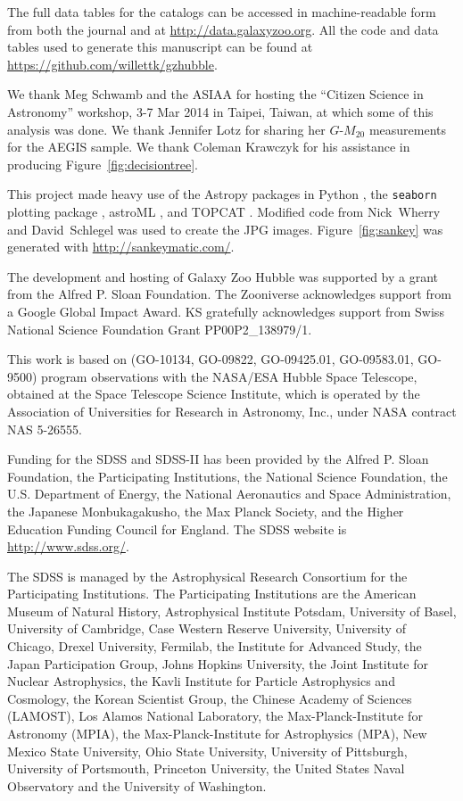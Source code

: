 \documentclass[twocolumn]{aastex6}
\begin{document}
The full data tables for the catalogs can be accessed in machine-readable form
from both the journal and at \url{http://data.galaxyzoo.org}. All the code and
data tables used to generate this manuscript can be found at
\url{https://github.com/willettk/gzhubble}.
 
\acknowledgments

We thank Meg Schwamb and the ASIAA for hosting the ``Citizen Science in
Astronomy'' workshop, 3-7 Mar 2014 in Taipei, Taiwan, at which some of this
analysis was done. We thank Jennifer Lotz for sharing her $G$-$M_{20}$
measurements for the AEGIS sample. We thank Coleman Krawczyk for his assistance
in producing Figure~\ref{fig:decisiontree}.

This project made heavy use of the Astropy packages in Python \citep{ast13},
the \texttt{seaborn} plotting package \citep{was15}, astroML \citep{van12}, and
TOPCAT \citep{tay05,tay11}. Modified code from Nick~Wherry and David~Schlegel
was used to create the JPG images. Figure~\ref{fig:sankey} was generated with
\url{http://sankeymatic.com/}.

The development and hosting of Galaxy Zoo Hubble was supported by a grant from
the Alfred P. Sloan Foundation. The Zooniverse acknowledges support from a
Google Global Impact Award. KS gratefully acknowledges support from Swiss
National Science Foundation Grant PP00P2\_138979/1.

This work is based on (GO-10134, GO-09822, GO-09425.01, GO-09583.01, GO-9500)
program observations with the NASA/ESA Hubble Space Telescope, obtained at the
Space Telescope Science Institute, which is operated by the Association of
Universities for Research in Astronomy, Inc., under NASA contract NAS 5-26555. 

Funding for the SDSS and SDSS-II has been provided by the Alfred P. Sloan
Foundation, the Participating Institutions, the National Science Foundation,
the U.S. Department of Energy, the National Aeronautics and Space
Administration, the Japanese Monbukagakusho, the Max Planck Society, and the
Higher Education Funding Council for England. The SDSS website is
\url{http://www.sdss.org/}. 

The SDSS is managed by the Astrophysical Research Consortium for the
Participating Institutions. The Participating Institutions are the American
Museum of Natural History, Astrophysical Institute Potsdam, University of
Basel, University of Cambridge, Case Western Reserve University, University of
Chicago, Drexel University, Fermilab, the Institute for Advanced Study, the
Japan Participation Group, Johns Hopkins University, the Joint Institute for
Nuclear Astrophysics, the Kavli Institute for Particle Astrophysics and
Cosmology, the Korean Scientist Group, the Chinese Academy of Sciences
(LAMOST), Los Alamos National Laboratory, the Max-Planck-Institute for
Astronomy (MPIA), the Max-Planck-Institute for Astrophysics (MPA), New Mexico
State University, Ohio State University, University of Pittsburgh, University
of Portsmouth, Princeton University, the United States Naval Observatory and
the University of Washington. 
\end{document}
